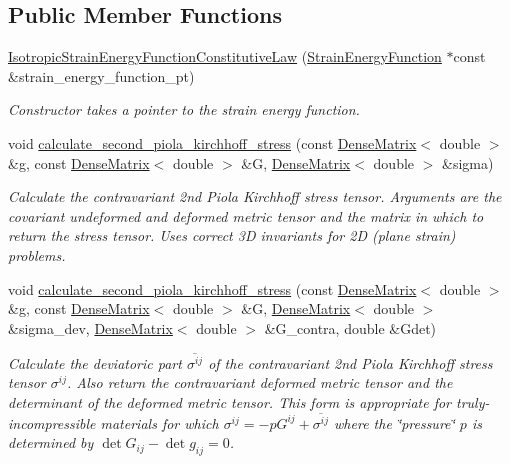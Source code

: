 \subsection*{Public Member Functions}
\begin{DoxyCompactItemize}
\item 
\hyperlink{classoomph_1_1IsotropicStrainEnergyFunctionConstitutiveLaw_aae7ab7763c630cb8296118da81fc5905}{Isotropic\+Strain\+Energy\+Function\+Constitutive\+Law} (\hyperlink{classoomph_1_1StrainEnergyFunction}{Strain\+Energy\+Function} $\ast$const \&strain\+\_\+energy\+\_\+function\+\_\+pt)
\begin{DoxyCompactList}\small\item\em Constructor takes a pointer to the strain energy function. \end{DoxyCompactList}\item 
void \hyperlink{classoomph_1_1IsotropicStrainEnergyFunctionConstitutiveLaw_af6c25617b8be6cc454d6b526ec6121fc}{calculate\+\_\+second\+\_\+piola\+\_\+kirchhoff\+\_\+stress} (const \hyperlink{classoomph_1_1DenseMatrix}{Dense\+Matrix}$<$ double $>$ \&g, const \hyperlink{classoomph_1_1DenseMatrix}{Dense\+Matrix}$<$ double $>$ \&G, \hyperlink{classoomph_1_1DenseMatrix}{Dense\+Matrix}$<$ double $>$ \&sigma)
\begin{DoxyCompactList}\small\item\em Calculate the contravariant 2nd Piola Kirchhoff stress tensor. Arguments are the covariant undeformed and deformed metric tensor and the matrix in which to return the stress tensor. Uses correct 3D invariants for 2D (plane strain) problems. \end{DoxyCompactList}\item 
void \hyperlink{classoomph_1_1IsotropicStrainEnergyFunctionConstitutiveLaw_acf61673ecc4f960fee908378ac48544a}{calculate\+\_\+second\+\_\+piola\+\_\+kirchhoff\+\_\+stress} (const \hyperlink{classoomph_1_1DenseMatrix}{Dense\+Matrix}$<$ double $>$ \&g, const \hyperlink{classoomph_1_1DenseMatrix}{Dense\+Matrix}$<$ double $>$ \&G, \hyperlink{classoomph_1_1DenseMatrix}{Dense\+Matrix}$<$ double $>$ \&sigma\+\_\+dev, \hyperlink{classoomph_1_1DenseMatrix}{Dense\+Matrix}$<$ double $>$ \&G\+\_\+contra, double \&Gdet)
\begin{DoxyCompactList}\small\item\em Calculate the deviatoric part $ \overline{ \sigma^{ij}}$ of the contravariant 2nd Piola Kirchhoff stress tensor $ \sigma^{ij}$. Also return the contravariant deformed metric tensor and the determinant of the deformed metric tensor. This form is appropriate for truly-\/incompressible materials for which $ \sigma^{ij} = - p G^{ij} +\overline{ \sigma^{ij}} $ where the \char`\"{}pressure\char`\"{} $ p $ is determined by $ \det G_{ij} - \det g_{ij} = 0 $. \end{DoxyCompactList}\item 

\end{DoxyCompactItemize}
